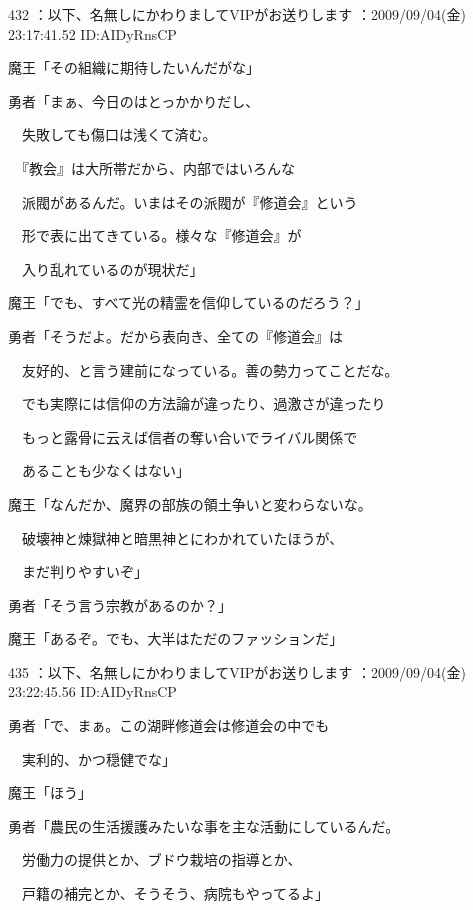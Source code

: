 \documentclass[a4j,twocolumn]{tarticle}
\begin{document}
	
    
    

432 ：以下、名無しにかわりましてVIPがお送りします ：2009/09/04(金) 23:17:41.52 ID:AIDyRnsCP 


魔王「その組織に期待したいんだがな」 



勇者「まぁ、今日のはとっかかりだし、\par{} 
　失敗しても傷口は浅くて済む。\par{} 
　『教会』は大所帯だから、内部ではいろんな\par{} 
　派閥があるんだ。いまはその派閥が『修道会』という\par{} 
　形で表に出てきている。様々な『修道会』が\par{} 
　入り乱れているのが現状だ」 



魔王「でも、すべて光の精霊を信仰しているのだろう？」 



勇者「そうだよ。だから表向き、全ての『修道会』は\par{} 
　友好的、と言う建前になっている。善の勢力ってことだな。\par{} 
　でも実際には信仰の方法論が違ったり、過激さが違ったり\par{} 
　もっと露骨に云えば信者の奪い合いでライバル関係で\par{} 
　あることも少なくはない」 



魔王「なんだか、魔界の部族の領土争いと変わらないな。\par{} 
　破壊神と煉獄神と暗黒神とにわかれていたほうが、\par{} 
　まだ判りやすいぞ」 



勇者「そう言う宗教があるのか？」\par{} 
魔王「あるぞ。でも、大半はただのファッションだ」 

	
    
    

435 ：以下、名無しにかわりましてVIPがお送りします ：2009/09/04(金) 23:22:45.56 ID:AIDyRnsCP 


勇者「で、まぁ。この湖畔修道会は修道会の中でも\par{} 
　実利的、かつ穏健でな」\par{} 
魔王「ほう」 



勇者「農民の生活援護みたいな事を主な活動にしているんだ。\par{} 
　労働力の提供とか、ブドウ栽培の指導とか、\par{} 
　戸籍の補完とか、そうそう、病院もやってるよ」 
\end{document}
